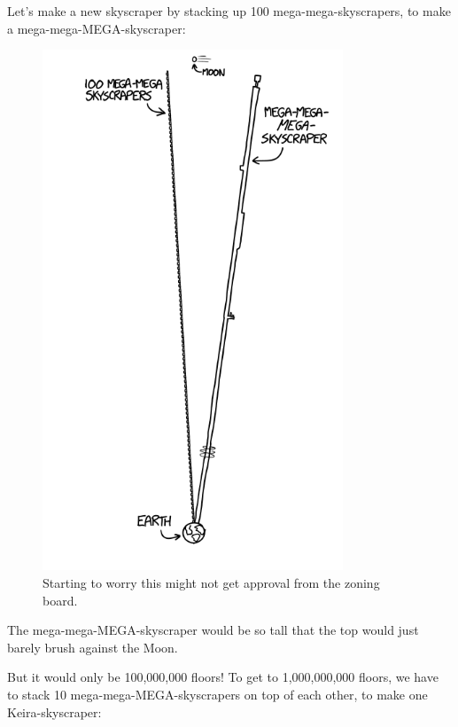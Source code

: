 {{Let's make a new skyscraper by stacking up 100 mega-mega-skyscrapers, to make a mega-mega-MEGA-skyscraper:}

\begin{figure}[!htbp]
\centering
\includegraphics[scale=0.5, max width=0.8\textwidth]{imgs/a/94/billion_100x100x100x100.png}
\caption{Starting to worry this might not get approval from the zoning board.}
\end{figure}

{The mega-mega-MEGA-skyscraper would be so tall that the top would just barely brush against the Moon.}

{But it would only be 100,000,000 floors! To get to 1,000,000,000 floors, we have to stack 10 mega-mega-MEGA-skyscrapers on top of each other, to make one Keira-skyscraper:}

}
